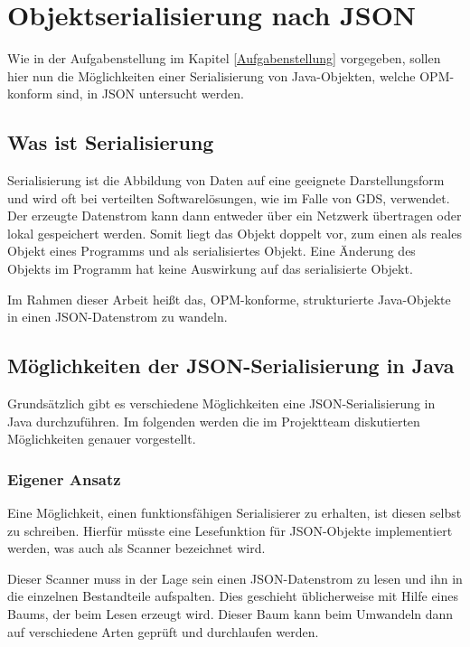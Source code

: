 \section{Objektserialisierung nach JSON}
Wie in der Aufgabenstellung im Kapitel \ref{Aufgabenstellung} vorgegeben, sollen hier nun die M\"oglichkeiten einer Serialisierung von Java-Objekten, welche OPM-konform sind, in \ac{JSON} untersucht werden.

\subsection{Was ist Serialisierung}
Serialisierung ist die Abbildung von Daten auf eine geeignete Darstellungsform und wird oft bei verteilten Softwarel\"osungen, wie im Falle von \ac{GDS}, verwendet. Der erzeugte Datenstrom kann dann entweder \"uber ein Netzwerk \"ubertragen oder lokal gespeichert werden. Somit liegt das Objekt doppelt vor, zum einen als reales Objekt eines Programms und als serialisiertes Objekt. Eine \"Anderung des Objekts im Programm hat keine Auswirkung auf das serialisierte Objekt. \cite{WikiSeri}

Im Rahmen dieser Arbeit hei\ss{}t das, \ac{OPM}-konforme, strukturierte Java-Objekte in einen \ac{JSON}-Datenstrom zu wandeln. 

\subsection{M\"oglichkeiten der JSON-Serialisierung in Java}
Grunds\"atzlich gibt es verschiedene M\"oglichkeiten eine \ac{JSON}-Serialisierung in Java 
durchzuf\"uhren. Im folgenden werden die im Projektteam diskutierten M\"oglichkeiten genauer vorgestellt. 

\subsubsection{Eigener Ansatz}
Eine M\"oglichkeit, einen funktionsf\"ahigen Serialisierer zu erhalten, ist diesen selbst zu schreiben. Hierf\"ur m\"usste eine Lesefunktion f\"ur \ac{JSON}-Objekte implementiert werden, was auch als Scanner bezeichnet wird. 

Dieser Scanner muss in der Lage sein einen \ac{JSON}-Datenstrom zu lesen und ihn in die einzelnen Bestandteile aufspalten. Dies geschieht \"ublicherweise mit Hilfe eines Baums, der beim Lesen erzeugt wird. Dieser Baum kann beim Umwandeln dann auf verschiedene Arten gepr\"uft und durchlaufen werden.

